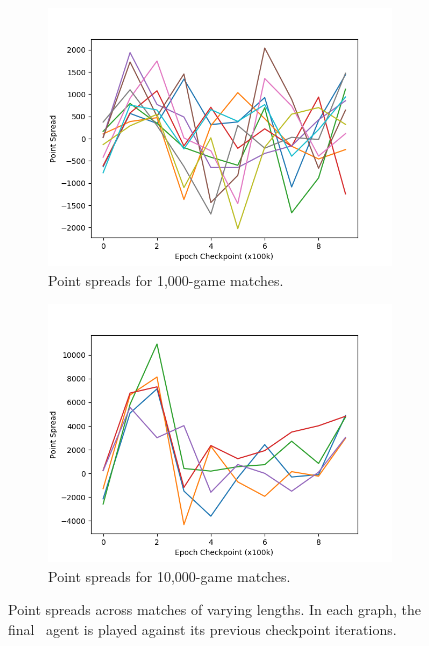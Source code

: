 \begin{figure}
\begin{subfigure}[b]{0.66\textwidth}
	\center
	\includegraphics[width=\textwidth]{images/discussion/usefulness/r2-time-series-1000.png}
	\caption{Point spreads for 1,000-game matches.}
	\label{fig:r2-time-series-1000}
\end{subfigure}

\begin{subfigure}[b]{0.66\textwidth}
	\center
	\includegraphics[width=\textwidth]{images/discussion/usefulness/r2-time-series-10000.png}
	\caption{Point spreads for 10,000-game matches.}
	\label{fig:r2-time-series-10000}
\end{subfigure}

\caption{
	Point spreads across matches of varying lengths.
	In each graph,
	the final \learned\ agent is played against its previous checkpoint
	iterations.
}
\label{fig:r2-time-series}
\end{figure}
